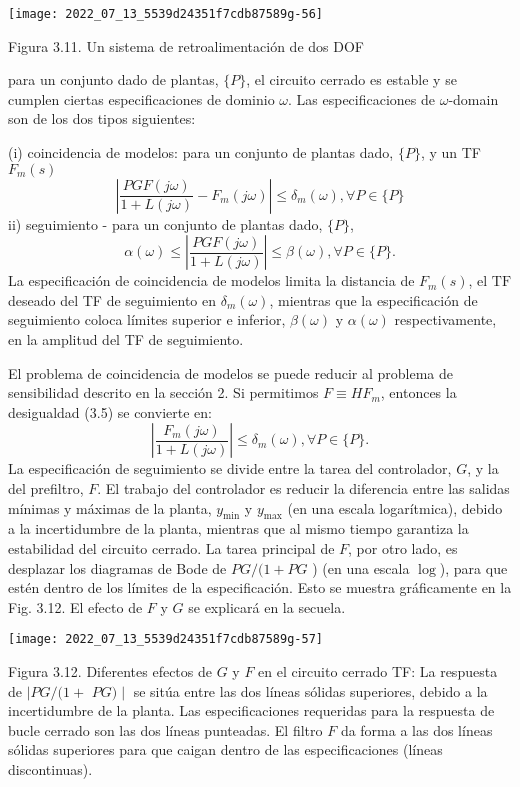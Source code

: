 \texttt{[image: 2022\_07\_13\_5539d24351f7cdb87589g-56]}

Figura 3.11. Un sistema de retroalimentación de dos DOF

para un conjunto dado de plantas, $\{P\}$, el circuito cerrado es estable y se cumplen ciertas especificaciones de dominio $\omega$. Las especificaciones de $\omega$-domain son de los dos tipos siguientes:

(i) coincidencia de modelos: para un conjunto de plantas dado, $\{P\}$, y un TF $F_{m}(s)$
$$
\left|\frac{P G F(j \omega)}{1+L(j \omega)}-F_{m}(j \omega)\right| \leq \delta_{m}(\omega), \forall P \in\{P\}
$$
ii) seguimiento - para un conjunto de plantas dado, $\{P\}$,
$$
\alpha(\omega) \leq\left|\frac{P G F(j \omega)}{1+L(j \omega)}\right| \leq \beta(\omega), \forall P \in\{P\} .
$$
La especificación de coincidencia de modelos limita la distancia de $F_{m}(s)$, el $\mathrm{TF}$ deseado del TF de seguimiento en $\delta_{m}(\omega)$, mientras que la especificación de seguimiento coloca límites superior e inferior, $\beta(\omega)$ y $\alpha(\omega)$ respectivamente, en la amplitud del TF de seguimiento.

El problema de coincidencia de modelos se puede reducir al problema de sensibilidad descrito en la sección 2. Si permitimos $F \equiv H F_{m}$, entonces la desigualdad (3.5) se convierte en:
$$
\left|\frac{F_{m}(j \omega)}{1+L(j \omega)}\right| \leq \delta_{m}(\omega), \forall P \in\{P\} .
$$
La especificación de seguimiento se divide entre la tarea del controlador, $G$, y la del prefiltro, $F$. El trabajo del controlador es reducir la diferencia entre las salidas mínimas y máximas de la planta, $y_{\min }$ y $y_{\max }$ (en una escala logarítmica), debido a la incertidumbre de la planta, mientras que al mismo tiempo garantiza la estabilidad del circuito cerrado. La tarea principal de $F$, por otro lado, es desplazar los diagramas de Bode de $P G /(1+P G$ ) (en una escala $\log$), para que estén dentro de los límites de la especificación. Esto se muestra gráficamente en la Fig. 3.12. El efecto de $F$ y $G$ se explicará en la secuela.

\texttt{[image: 2022\_07\_13\_5539d24351f7cdb87589g-57]}

Figura 3.12. Diferentes efectos de $G$ y $F$ en el circuito cerrado TF: La respuesta de $\mid P G /(1+$ $P G) \mid$ se sitúa entre las dos líneas sólidas superiores, debido a la incertidumbre de la planta. Las especificaciones requeridas para la respuesta de bucle cerrado son las dos líneas punteadas. El filtro $F$ da forma a las dos líneas sólidas superiores para que caigan dentro de las especificaciones (líneas discontinuas).

